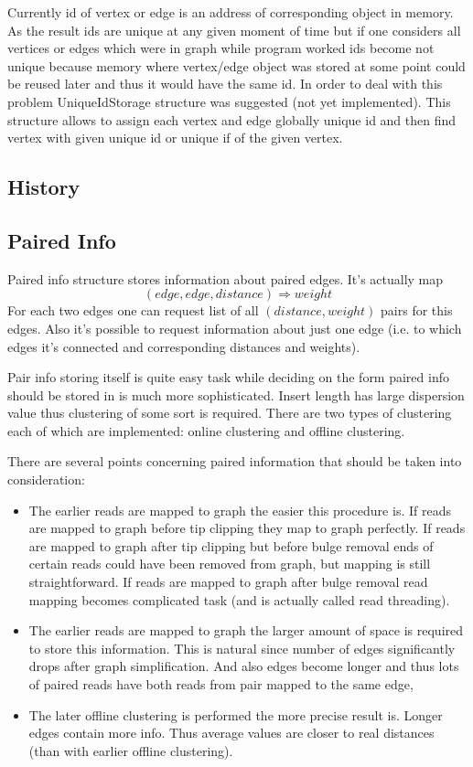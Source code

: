 \documentclass[12pt]{article}
\begin{document}
Currently id of vertex or edge is an address of corresponding object in memory. As the result ids are unique at any given moment of time but if one considers all vertices or edges which were in graph while program worked ids become not unique because memory where vertex/edge object was stored at some point could be reused later and thus it would have the same id. In order to deal with this problem UniqueIdStorage structure was suggested (not yet implemented). This structure allows to assign each vertex and edge globally unique id and then find vertex with given unique id or unique if of the given vertex.

\subsection{History}

\subsection{Paired Info}

Paired info structure stores information about paired edges. It's actually map $$(edge, edge, distance) \Rightarrow weight$$ 
For each two edges one can request list of all $(distance, weight)$ pairs for this edges. Also it's possible to request information about just one edge (i.e. to which edges it's connected and corresponding distances and weights).

Pair info storing itself is quite easy task while deciding on the form paired info should be stored in is much more sophisticated. Insert length has large dispersion value thus clustering of some sort is required. There are two types of clustering each of which are implemented: online clustering and offline clustering.

There are several points concerning paired information that should be taken into consideration:

\begin{itemize}
\item The earlier reads are mapped to graph the easier this procedure is. If reads are mapped to graph before tip clipping they map to graph perfectly. If reads are mapped to graph after tip clipping but before bulge removal ends of certain reads could have been removed from graph, but mapping is still straightforward. If reads are mapped to graph after bulge removal read mapping becomes complicated task (and is actually called read threading).

\item The earlier reads are mapped to graph the larger amount of space is required to store this information. This is natural since number of edges significantly drops after graph simplification. And also edges become longer and thus lots of paired reads have both reads from pair mapped to the same edge,

\item The later offline clustering is performed the more precise result is. Longer edges contain more info. Thus average values are closer to real distances (than with earlier offline clustering).
\end{itemize}
\end{document}
